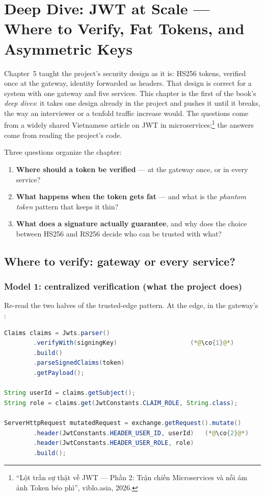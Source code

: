\chapter{Deep Dive: JWT at Scale --- Where to Verify, Fat Tokens, and Asymmetric Keys}
\label{ch:jwt-scale}

Chapter~5 taught the project's security design as it is: HS256 tokens,
verified once at the gateway, identity forwarded as headers. That design
is correct for a system with one gateway and five services. This chapter
is the first of the book's \emph{deep dives}: it takes one design already
in the project and pushes it until it breaks, the way an interviewer or a
tenfold traffic increase would. The questions come from a widely shared
Vietnamese article on JWT in
microservices;\footnote{``Lột trần sự thật về JWT --- Phần 2: Trận chiến
Microservices và nỗi ám ảnh Token béo phì'', viblo.asia, 2026.} the
answers come from reading the project's code.

Three questions organize the chapter:

\begin{enumerate}
  \item \textbf{Where should a token be verified} --- at the gateway
  once, or in every service?
  \item \textbf{What happens when the token gets fat} --- and what is the
  \emph{phantom token} pattern that keeps it thin?
  \item \textbf{What does a signature actually guarantee}, and why does
  the choice between HS256 and RS256 decide who can be trusted with what?
\end{enumerate}

\section{Where to verify: gateway or every service?}
\label{sec:where-to-verify}

\subsection{Model 1: centralized verification (what the project does)}

Re-read the two halves of the trusted-edge pattern. At the edge, in the
gateway's :

\begin{lstlisting}[language=Java]
Claims claims = Jwts.parser()
        .verifyWith(signingKey)                    (*@\co{1}@*)
        .build()
        .parseSignedClaims(token)
        .getPayload();

String userId = claims.getSubject();
String role = claims.get(JwtConstants.CLAIM_ROLE, String.class);

ServerHttpRequest mutatedRequest = exchange.getRequest().mutate()
        .header(JwtConstants.HEADER_USER_ID, userId)   (*@\co{2}@*)
        .header(JwtConstants.HEADER_USER_ROLE, role)
        .build();
\end{lstlisting}

